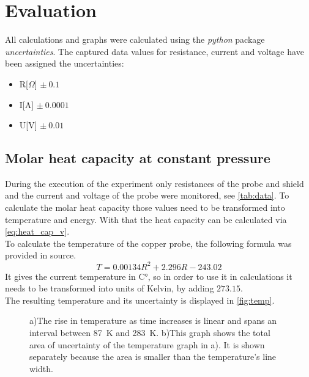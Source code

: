 \newpage
\section{Evaluation}
\label{sec:auswertung}

All calculations and graphs were calculated using the \textit{python} package \textit{uncertainties}\cite{uncertainties}.
The captured data values for resistance, current and voltage have been assigned the uncertainties:
\begin{itemize}
    \item R[$\Omega$] $\pm\ 0.1$
    \item I[A] $\pm\ 0.0001$
    \item U[V] $\pm\ 0.01$
\end{itemize}

\subsection{Molar heat capacity at constant pressure}
During the execution of the experiment only resistances of the probe and shield and the current and voltage of the probe were monitored, see \autoref{tab:data}.
To calculate the molar heat capacity those values need to be transformed into temperature and energy.
With that the heat capacity can be calculated via \autoref{eq:heat_cap_v}.\\
\newline
To calculate the temperature of the copper probe, the following formula was provided in source\cite{V47}.
\begin{equation}
    T = 0.00134R^2+2.296R-243.02
\end{equation}
It gives the current temperature in C°, so in order to use it in calculations it needs to be transformed into units of Kelvin, by adding $273.15$.\\
The resulting temperature and its uncertainty is displayed in \autoref{fig:temp}.

\begin{figure}[H]
    \centering
    \qquad
    \caption{a)The rise in temperature as time increases is linear and spans an interval between \SI{87}{\kelvin} and \SI{283}{\kelvin}.
    b)This graph shows the total area of uncertainty of the temperature graph in a). It is shown separately because the area is smaller than the temperature's line width.}
    \label{fig:temp}
\end{figure}

